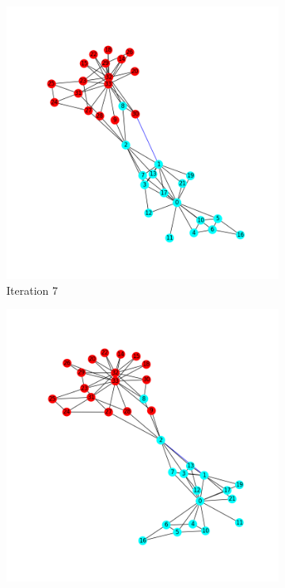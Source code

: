 \documentclass[11pt]{article} %
\begin{document}
\begin{figure}[h!]
  \centering
  \begin{subfigure}[b]{0.4\linewidth}
    \includegraphics[width=\linewidth]{../Figures/Iteration7.png}
    \caption{Iteration 7}
  \end{subfigure}
\begin{subfigure}[b]{0.4\linewidth}
    \includegraphics[width=\linewidth]{../Figures/Iteration8.png}

\end{subfigure}
\end{figure}
\end{document}
